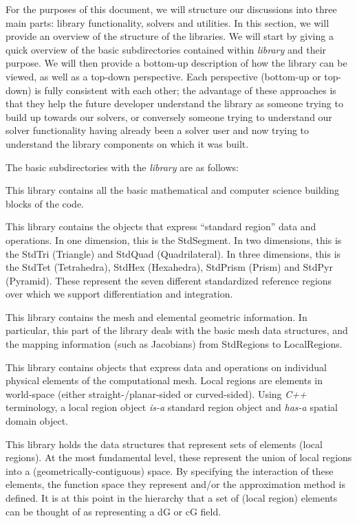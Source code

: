 For the purposes of this document, we will structure our discussions into three main parts:  library functionality, solvers and utilities.  In this
section, we will provide an overview of the structure of the libraries.  We will start by giving a quick overview of the basic subdirectories
contained within {\em library} and their purpose.  We will then provide a bottom-up description of how the library can be viewed, as well
as a top-down perspective.  Each perspective (bottom-up or top-down) is fully consistent with each other; the advantage of these approaches
is that they help the future developer understand the library as someone trying to build up towards our solvers, or conversely someone trying
to understand our solver functionality having already been a solver user and now trying to understand the library components on which it was built.

The basic subdirectories with the {\em library} are as follows:

  This library contains all the basic mathematical and computer science building blocks of the {\nek} code.

 This library contains the objects that express ``standard region'' data and operations.  In one dimension, this is the StdSegment.  In two 
dimensions, this is the StdTri (Triangle) and StdQuad (Quadrilateral).  In three dimensions, this is the StdTet (Tetrahedra), 
StdHex (Hexahedra), StdPrism (Prism) and StdPyr (Pyramid).  These represent the seven different standardized reference regions over which 
we support differentiation and integration. 

 This library contains the mesh and elemental geometric information.  In particular, this part of the library deals with the basic mesh 
data structures, and the mapping information (such as Jacobians) from StdRegions to LocalRegions.

  This library contains objects that express data and operations on individual physical elements of the computational mesh.  Local regions are \shp{} elements in
world-space (either straight-/planar-sided or curved-sided).  Using {\em C++} terminology, a local region object {\em is-a} standard region object and {\em has-a} spatial domain object.

 This library holds the data structures that represent sets of elements (local regions).  At the most fundamental 
level, these represent the union of local regions into a (geometrically-contiguous) space.  By specifying the interaction of these elements, the function space they represent and/or the approximation method is defined.  It is at this point in the hierarchy that a set of (local region) elements can be thought of as representing a dG or cG field.

